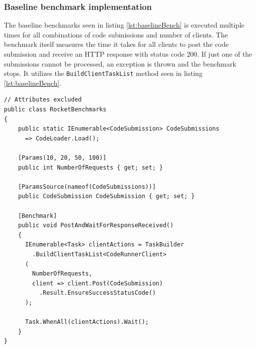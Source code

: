 \subsubsection{Baseline benchmark implementation}
The baseline benchmarks seen in listing \ref{lst:baselineBench} is executed multiple times for all combinations of code submissions and number of clients.
The benchmark itself measures the time it takes for all clients to post the code submission and receive an HTTP response with status code 200.
If just one of the submissions cannot be processed, an exception is thrown and the benchmark stops.
It utilizes the \texttt{BuildClientTaskList} method seen in listing \ref{lst:baselineBench}.
\begin{lstlisting}[language=CSharp, escapechar=~, caption={C\# code showing the benchmark implementation for the synchronous baseline}, label={lst:baselineBench}]
// Attributes excluded
public class RocketBenchmarks
{
    public static IEnumerable<CodeSubmission> CodeSubmissions
      => CodeLoader.Load();

    [Params(10, 20, 50, 100)]
    public int NumberOfRequests { get; set; }

    [ParamsSource(nameof(CodeSubmissions))]
    public CodeSubmission CodeSubmission { get; set; }

    [Benchmark]
    public void PostAndWaitForResponseReceived()
    {
      IEnumerable<Task> clientActions = TaskBuilder
        .BuildClientTaskList<CodeRunnerClient>
      (
        NumberOfRequests,
        client => client.Post(CodeSubmission)
          .Result.EnsureSuccessStatusCode()
      );

      Task.WhenAll(clientActions).Wait();
    }
}
\end{lstlisting}

